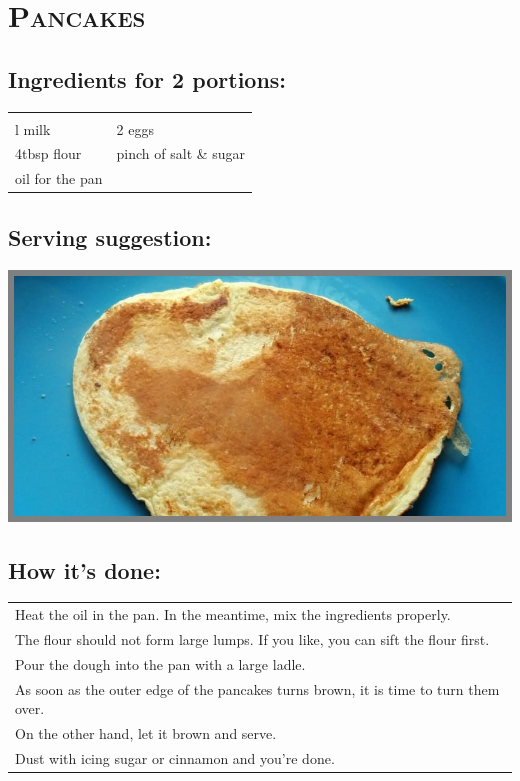 \section{\textsc{Pancakes}}

\subsection*{Ingredients for 2 portions:}

\begin{tabular}{p{7.5cm} p{7.5cm}}
	& \\
	\sfrac{1}{4}l milk & 2 eggs \\
	4tbsp flour & pinch of salt \& sugar \\
  oil for the pan
\end{tabular}

\subsection*{Serving suggestion:}

\includegraphics[width=\textwidth]{img/pfannkuchen.jpg} \cite{pfannkuchen}

\subsection*{How it's done:}

\begin{tabular}{p{15cm}}
	\\
  Heat the oil in the pan. In the meantime, mix the ingredients properly.\\
  The flour should not form large lumps. If you like, you can sift the flour first.\\
  Pour the dough into the pan with a large ladle.\\
  As soon as the outer edge of the pancakes turns brown, it is time to turn them over.\\
  On the other hand, let it brown and serve.\\
  Dust with icing sugar or cinnamon and you're done.
\end{tabular}
